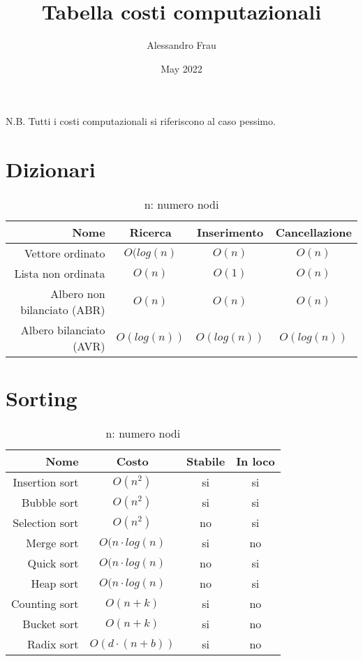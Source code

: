 \documentclass{article}
\title{Tabella costi computazionali}
\author{Alessandro Frau}
\date{May 2022}
\begin{document}
\maketitle
\tableofcontents
\newline
\newline
N.B. Tutti i costi computazionali si riferiscono al caso pessimo.
\section{Dizionari}
\begin{table}[H]
    \centering
    \def\arraystretch{1.5}
    \begin{tabular}{|r|c|c|c|} \hline
          \textbf{Nome} & \textbf{Ricerca} & \textbf{Inserimento} & \textbf{Cancellazione}\\ \hline
          Vettore ordinato & $O(log(n)$ & $O(n)$ & $O(n)$ \\ \hline
          Lista non ordinata & $O(n)$ & $O(1)$ & $O(n)$ \\ \hline
          Albero non bilanciato (ABR) & $O(n)$ & $O(n)$ & $O(n)$ \\ \hline
          Albero bilanciato (AVR) & $O(log(n))$ & $O(log(n))$ & $O(log(n))$ \\ \hline
    \end{tabular}
    \caption{n: numero nodi}
    \label{tab:my_label}
\end{table}
\newpage
\section{Sorting}
\begin{table}[H]
    \centering
    \def\arraystretch{1.5}
    \begin{tabular}{|r|c|c|c|} \hline
          \textbf{Nome} & \textbf{Costo} & \textbf{Stabile} & \textbf{In loco}\\ \hline
          Insertion sort & $O(n^2)$ & \cellcolor{green}si & \cellcolor{green}si \\ \hline
          Bubble sort & $O(n^2)$ & \cellcolor{green}si & \cellcolor{green}si \\ \hline
          Selection sort & $O(n^2)$ & \cellcolor{red}no & \cellcolor{green}si \\ \hline
          Merge sort & $O(n\cdot log(n)$ & \cellcolor{green}si & \cellcolor{red}no \\ \hline
          Quick sort & $O(n\cdot log(n)$ & \cellcolor{red}no & \cellcolor{green}si \\ \hline
          Heap sort & $O(n\cdot log(n)$ & \cellcolor{red}no & \cellcolor{green}si \\ \hline
          Counting sort & $O(n+k)$ & \cellcolor{green}si & \cellcolor{red}no \\ \hline
          Bucket sort & $O(n+k)$ & \cellcolor{green}si & \cellcolor{red}no \\ \hline
          Radix sort & $O(d \cdot (n+b))$ & \cellcolor{green}si & \cellcolor{red}no \\ \hline
    \end{tabular}
    \caption{n: numero nodi}
    \label{tab:my_label}
\end{table}
\end{document}
